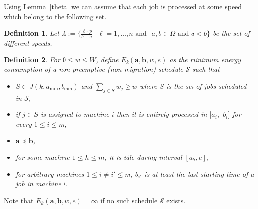 \documentclass[11pt,a4paper]{article}
\newtheorem{definition}{Definition}
\newcommand{\vecteur}[1]{\ensuremath{\mathbf{#1}}}
\begin{document}
Using Lemma~\ref{theta} we can assume that each job is processed at some speed which belong to the following set.

\begin{definition}	\label{set_of_speed}
Let $\Lambda :=\{ \frac{\ell \cdot p}{b-a}~|~ \ell = 1,\ldots ,n \mbox{ and }$
$a,b\in\Omega  \mbox{ and } a< b \}$ be the set of different speeds.
\end{definition}


\begin{definition}\label{def:Eksxtu}
For $0\leq w\leq W$, define $E_k(\vecteur{a},\vecteur{b},w,e)$ as the minimum energy consumption 
of a non-preemptive (non-migration) schedule $\mathcal{S}$ such that 
\begin{itemize}
\item $S \subset J(k,a_{\min},b_{\min})$ 
	and  $\sum_{j\in S}w_j\ge w$ where $S$ is the set of jobs scheduled in $\mathcal{S}$, 
\item if $j \in S$ is assigned to machine $i$ then it is entirely processed in 
	$[a_i,$ $b_i]$ for every $1\le i \le m$,
\item $\vecteur{a} \preceq \vecteur{b}$,
\item for some machine $1 \leq h \leq m$, it is idle during interval $[a_{h},e]$,
\item for arbitrary machines $1 \leq i \neq i' \leq m$, $b_{i'}$ is at least the last 
	starting time of a job in machine $i$. 
\end{itemize}
\end{definition}
Note that $E_k(\vecteur{a},\vecteur{b},w,e) = \infty$ if no such schedule $\mathcal{S}$
exists. 
\end{document}
